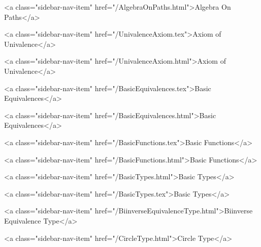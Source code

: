           <a class="sidebar-nav-item" href="/AlgebraOnPaths.html">Algebra On Paths</a>
        
      
    
      
        
          <a class="sidebar-nav-item" href="/UnivalenceAxiom.tex">Axiom of Univalence</a>
        
      
    
      
        
          <a class="sidebar-nav-item" href="/UnivalenceAxiom.html">Axiom of Univalence</a>
        
      
    
      
        
          <a class="sidebar-nav-item" href="/BasicEquivalences.tex">Basic Equivalences</a>
        
      
    
      
        
          <a class="sidebar-nav-item" href="/BasicEquivalences.html">Basic Equivalences</a>
        
      
    
      
        
          <a class="sidebar-nav-item" href="/BasicFunctions.tex">Basic Functions</a>
        
      
    
      
        
          <a class="sidebar-nav-item" href="/BasicFunctions.html">Basic Functions</a>
        
      
    
      
        
          <a class="sidebar-nav-item" href="/BasicTypes.html">Basic Types</a>
        
      
    
      
        
          <a class="sidebar-nav-item" href="/BasicTypes.tex">Basic Types</a>
        
      
    
      
        
          <a class="sidebar-nav-item" href="/BiinverseEquivalenceType.html">Biinverse Equivalence Type</a>
        
      
    
      
        
          <a class="sidebar-nav-item" href="/CircleType.html">Circle Type</a>
        
      
    
